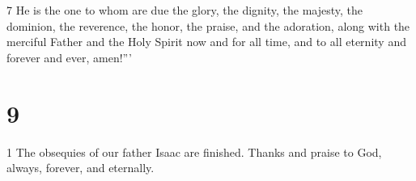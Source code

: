 \par 7 He is the one to whom are due the glory, the dignity, the majesty, the dominion, the reverence, the honor, the praise, and the adoration, along with the merciful Father and the Holy Spirit now and for all time, and to all eternity and forever and ever, amen!”’ 

\chapter{9}

\par 1 The obsequies of our father Isaac are finished. Thanks and praise to God, always, forever, and eternally. 



